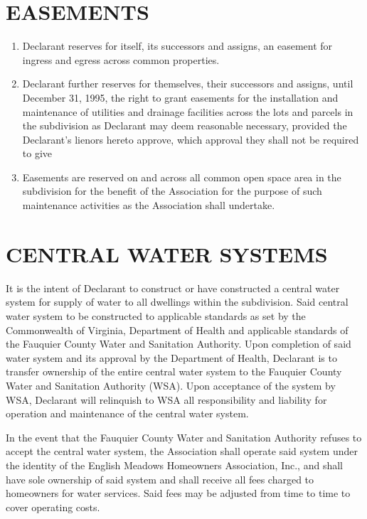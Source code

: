 \documentclass[12pt, letterpaper]{article}
\begin{document}
\section{EASEMENTS}
\begin{enumerate}
\item Declarant reserves for itself, its successors and assigns, an easement for ingress and egress across common properties.
\item Declarant further reserves for themselves, their successors and assigns, until December 31, 1995, the right to grant easements for the installation and maintenance of utilities and drainage facilities across the lots and parcels in the subdivision as Declarant may deem reasonable necessary, provided the Declarant's lienors hereto approve, which approval they shall not be required to give
\item Easements are reserved on and across all common open space area in the subdivision for the benefit of the Association for the purpose of such maintenance activities as the Association shall undertake.
\end{enumerate}

\section{CENTRAL WATER SYSTEMS}
It is the intent of Declarant to construct or have constructed a central water system for supply of water to all dwellings within the subdivision.
Said central water system to be constructed to applicable standards as set by the Commonwealth of Virginia, Department of Health and applicable standards of the Fauquier County Water and Sanitation Authority.
Upon completion of said water system and its approval by the Department of Health, Declarant is to transfer ownership of the entire central water system to the Fauquier County Water and Sanitation Authority (WSA).
Upon acceptance of the system by WSA, Declarant will relinquish to WSA all responsibility and liability for operation and maintenance of the central water system.

In the event that the Fauquier County Water and Sanitation Authority refuses to accept the central water system, the Association shall operate said system under the identity of the English Meadows Homeowners Association, Inc., and shall have sole ownership of said system and shall receive all fees charged to homeowners for water services.
Said fees may be adjusted from time to time to cover operating costs.
\end{document}
